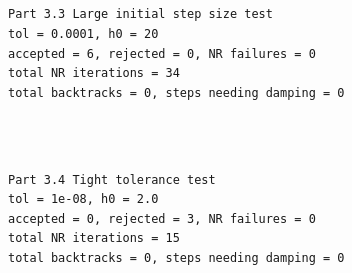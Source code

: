 \documentclass[11pt]{article}
\begin{document}
    \begin{center}
    \end{center}
    { \hspace*{\fill} \\}
    
    \begin{center}
    \end{center}
    { \hspace*{\fill} \\}
    
    \begin{center}
    \end{center}
    { \hspace*{\fill} \\}
    
    \begin{Verbatim}[commandchars=\\\{\}]

Part 3.3 Large initial step size test
tol = 0.0001, h0 = 20
accepted = 6, rejected = 0, NR failures = 0
total NR iterations = 34
total backtracks = 0, steps needing damping = 0
    \end{Verbatim}

    \begin{center}
    \end{center}
    { \hspace*{\fill} \\}
    
    \begin{Verbatim}[commandchars=\\\{\}]

Part 3.4 Tight tolerance test
tol = 1e-08, h0 = 2.0
accepted = 0, rejected = 3, NR failures = 0
total NR iterations = 15
total backtracks = 0, steps needing damping = 0
    \end{Verbatim}

    \begin{center}
    \end{center}
    { \hspace*{\fill} \\}
    
\end{document}
